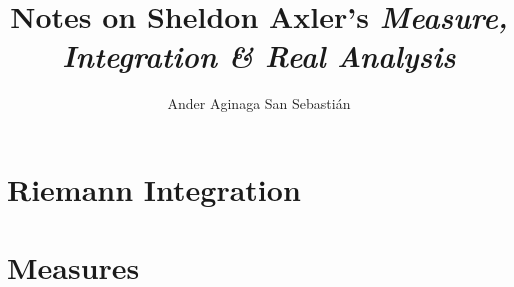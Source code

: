 


	\title{\textbf{Notes on Sheldon Axler's \textit{Measure, Integration \& Real Analysis}}}
	\author{Ander Aginaga San Sebastián}
	\date{}
	\maketitle
	
	\tableofcontents
	
	\chapter{Riemann Integration}
	
	
	
	\chapter{Measures}
	
	

